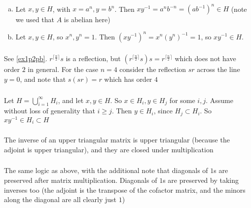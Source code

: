 \documentclass{article}
\newcommand{\inv}[1]{ {#1}^{-1} }
\newcommand{\ceil}[1]{\lceil #1 \rceil}
\begin{document}
\subsubsection{}\label{ex1p12}

\begin{enumerate}[(a)]
\item Let $x,y\in H$, with $x=a^n, y=b^n$. Then $x\inv{y} = a^nb^{-n} = (a\inv{b})^n \in H$ (note we used that $A$ is abelian here)
\item Let $x,y\in H$, so $x^n,y^n=1$. Then $(x\inv{y})^n = x^n\inv{(y^n)} = 1$, so $x\inv{y} \in H$.
\end{enumerate}
\subsubsection{}\label{ex1p13}
\subsubsection{}\label{ex1p14}
\newcommand{\lereflect}{r^{\ceil{\frac{n}{2}}}s}
See \ref{ex1p2pb}. $\lereflect$ is a reflection, but $(\lereflect)s = r^{\ceil{\frac{n}{2}}}$ which does not have order $2$ in general. For the case $n=4$ consider the reflection $sr$ across the line $y=0$, and note that $s(sr) = r$ which has order $4$
\subsubsection{}\label{ex1p15}
Let $H = \bigcup_{i=1}^{\infty}H_i$, and let $x,y\in H$. So $x \in H_i, y\in H_j$ for some $i,j$. Assume without loss of generality that $i \geq j$. Then $y \in H_i$, since $H_j \subset H_i$. So $x\inv{y} \in H_i \subset H$
\subsubsection{}\label{ex1p16} 
The inverse of an upper triangular matrix is upper triangular (because the adjoint is upper triangular), and they are closed under multiplication
\subsubsection{}\label{ex1p17}
The same logic as above, with the additional note that diagonals of $1$s are preserved after matrix multiplication. Diagonals of $1$s are preserved by taking inverses too (the adjoint is the transpose of the cofactor matrix, and the minors along the diagonal are all clearly just $1$)
\end{document}
